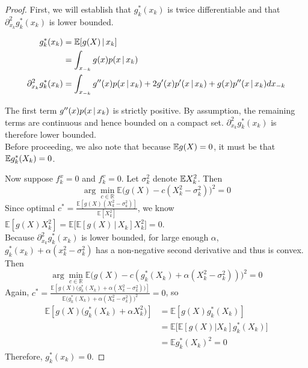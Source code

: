 \documentclass{article}
\begin{document}
\begin{proof}


First, we will establish that $g^*_k(x_k)$ is twice differentiable and that $\partial^2_{x_k} g^*_k(x_k)$ is lower bounded. 

\begin{align*}
g^*_k(x_k) &= \mathbb{E}[ g(X) \,|\, x_k] \\
  &= \int_{x_{-k}} g(x) p(x \,|\, x_k) \\
\partial^2_{x_k} g^*_k(x_k) &= \int_{x_{-k}} g''(x) p(x \,|\, x_k) +
  2 g'(x) p'(x \,|\, x_k) + g(x) p''(x \,|\, x_k) dx_{-k} 
\end{align*}

The first term $g''(x) p(x \,|\, x_k)$ is strictly positive. By assumption, the remaining terms are continuous and hence bounded on a compact set. $\partial^2_{x_k} g^*_k(x_k)$ is therefore lower bounded.\\

Before proceeding, we also note that because $\mathbb{E} g(X) = 0$, it must be that $\mathbb{E} g^*_k(X_k) = 0$.

Now suppose $f^x_k = 0$ and $f^v_k = 0$. Let $\sigma_k^2$ denote $\mathbb{E} X_k^2$. Then 
\[
\arg\min_{c \in \mathbb{R}} \mathbb{E}\Big( g(X) - c (X_k^2-\sigma_k^2) \Big)^2 = 0
\]
Since optimal $c^* = \frac{\mathbb{E} [ g(X) (X_k^2-\sigma_k^2) ]}{\mathbb{E}[ X_k^2 ]}$, 
we know $\mathbb{E} [ g(X) X_k^2 ] = 
\mathbb{E} \Big[ \mathbb{E}[ g(X) \,|\, X_k] X_k^2 \Big] = 0$.\\

Because $\partial^2_{x_k} g^*_k(x_k)$ is lower bounded, for large enough $\alpha$, $g^*_k(x_k) + \alpha (x_k^2 - \sigma_k^2)$ has a non-negative second derivative and thus is convex. Then
\[
\arg\min_{c \in \mathbb{R}} \mathbb{E}\Big( g(X) 
       - c (g^*_k(X_k) + \alpha (X_k^2 - \sigma_k^2)) \Big)^2 = 0
\]
Again, $c^* = \frac{\mathbb{E}[g(X)\big( 
            g^*_k(X_k) + \alpha (X_k^2 - \sigma_k^2) \big)]}{\mathbb{E}
        \big( g^*_k(X_k) + \alpha (X_k^2 - \sigma_k^2) \big)^2} = 0$, so
\begin{align*}
\mathbb{E}[ g(X) \big( g^*_k(X_k) + \alpha X_k^2 \big) ] &= 
\mathbb{E}[ g(X) g^*_k(X_k) ] \\
& = \mathbb{E}\Big[ \mathbb{E}[g(X) | X_k]  g^*_k(X_k) \Big] \\
& = \mathbb{E} g^*_k(X_k)^2 = 0
\end{align*}
Therefore, $g^*_k(x_k) = 0$.

\end{proof}
\end{document}
